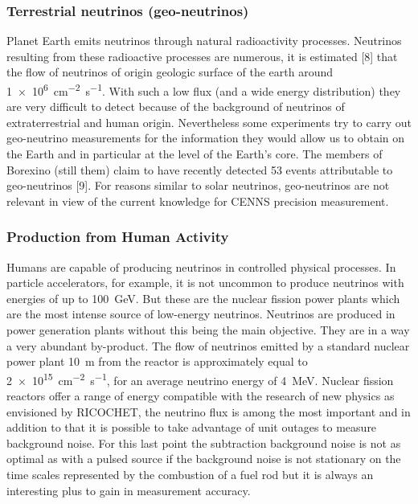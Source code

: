 \subsubsection{Terrestrial neutrinos (geo-neutrinos)}

Planet Earth emits neutrinos through natural radioactivity processes. Neutrinos resulting from these radioactive processes are numerous, it is estimated [8] that the flow of neutrinos of origin geologic surface of the earth around \SI{1e6}{\cm^{-2} \s^{-1}}. With such a low flux (and a wide energy distribution) they are very difficult to detect because of the background of neutrinos of extraterrestrial and human origin. Nevertheless some experiments try to carry out geo-neutrino measurements for the information they would allow us to obtain on the Earth and in particular at the level of the Earth's core. The members of Borexino (still them) claim to have recently detected 53 events attributable to geo-neutrinos [9]. For reasons similar to solar neutrinos, geo-neutrinos are not relevant in view of the current knowledge for CENNS precision measurement.

\subsubsection{Production from Human Activity}

Humans are capable of producing neutrinos in controlled physical processes. In particle accelerators, for example, it is not uncommon to produce neutrinos with energies of up to \SI{100}{\giga\eV}. But these are the nuclear fission power plants which are the most intense source of low-energy neutrinos. Neutrinos are produced in power generation plants without this being the main objective. They are in a way a very abundant by-product. The flow of neutrinos emitted by a standard nuclear power plant \SI{10}{\m} from the reactor is approximately equal to \SI{2e15}{\cm^{-2} \s^{-1}}, for an average neutrino energy of \SI{4}{\mega\eV}. Nuclear fission reactors offer a range of energy compatible with the research of new physics as envisioned by RICOCHET, the neutrino flux is among the most important and in addition to that it is possible to take advantage of unit outages to measure background noise. For this last point the subtraction background noise is not as optimal as with a pulsed source if the background noise is not stationary on the time scales represented by the combustion of a fuel rod but it is always an interesting plus to gain in measurement accuracy.


